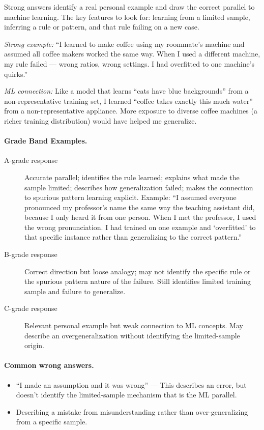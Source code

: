 Strong answers identify a real personal example and draw the correct parallel to machine learning. The key features to look for: learning from a limited sample, inferring a rule or pattern, and that rule failing on a new case.

\textit{Strong example:} ``I learned to make coffee using my roommate's machine and assumed all coffee makers worked the same way. When I used a different machine, my rule failed --- wrong ratios, wrong settings. I had overfitted to one machine's quirks.''

\textit{ML connection:} Like a model that learns ``cats have blue backgrounds'' from a non-representative training set, I learned ``coffee takes exactly this much water'' from a non-representative appliance. More exposure to diverse coffee machines (a richer training distribution) would have helped me generalize.

\paragraph{Grade Band Examples.}

\begin{description}
    \item[A-grade response] Accurate parallel; identifies the rule learned; explains what made the sample limited; describes how generalization failed; makes the connection to spurious pattern learning explicit. Example: ``I assumed everyone pronounced my professor's name the same way the teaching assistant did, because I only heard it from one person. When I met the professor, I used the wrong pronunciation. I had trained on one example and `overfitted' to that specific instance rather than generalizing to the correct pattern.''

    \item[B-grade response] Correct direction but loose analogy; may not identify the specific rule or the spurious pattern nature of the failure. Still identifies limited training sample and failure to generalize.

    \item[C-grade response] Relevant personal example but weak connection to ML concepts. May describe an overgeneralization without identifying the limited-sample origin.
\end{description}

\paragraph{Common wrong answers.}
\begin{itemize}
    \item ``I made an assumption and it was wrong'' --- This describes an error, but doesn't identify the limited-sample mechanism that is the ML parallel.
    \item Describing a mistake from misunderstanding rather than over-generalizing from a specific sample.
\end{itemize}

